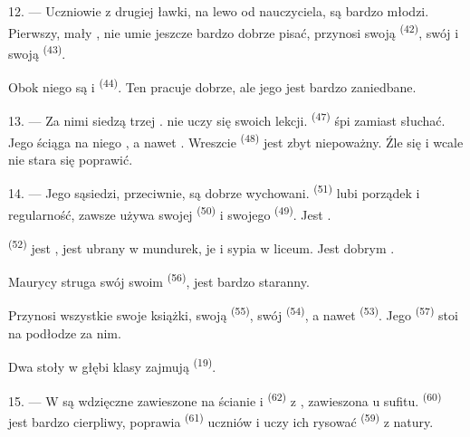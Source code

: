 12. --- Uczniowie z drugiej ławki, na lewo od nauczyciela, są bardzo młodzi. Pierwszy,
mały , nie umie jeszcze bardzo dobrze pisać, przynosi swoją
 \textsuperscript{(42)}, swój  i swoją 
\textsuperscript{(43)}.

Obok niego są  i  \textsuperscript{(44)}. Ten pracuje
dobrze, ale jego  jest bardzo zaniedbane.

13. --- Za nimi siedzą trzej .  nie uczy się swoich
lekcji.  \textsuperscript{(47)} śpi zamiast słuchać. Jego
 ściąga na niego , a nawet . Wreszcie
 \textsuperscript{(48)} jest zbyt niepoważny. Źle się 
i wcale nie stara się poprawić.

14. --- Jego sąsiedzi, przeciwnie, są dobrze wychowani. 
\textsuperscript{(51)} lubi porządek i regularność, zawsze używa swojej
 \textsuperscript{(50)} i swojego  \textsuperscript{(49)}.
Jest .

 \textsuperscript{(52)} jest , jest ubrany w
mundurek, je i sypia w liceum. Jest dobrym .

Maurycy struga swój  swoim  \textsuperscript{(56)},
jest bardzo staranny.

Przynosi wszystkie swoje książki, swoją  \textsuperscript{(55)}, swój
 \textsuperscript{(54)}, a nawet 
\textsuperscript{(53)}. Jego  \textsuperscript{(57)} stoi na podłodze
za nim.

Dwa stoły w głębi klasy zajmują  \textsuperscript{(19)}.

\VUsaut{4.6mm}
\VUsaut{3.4mm}

15. --- W  są wdzięczne  zawieszone na ścianie i
 \textsuperscript{(62)} z , zawieszona u sufitu.
 \textsuperscript{(60)} jest bardzo cierpliwy, poprawia
 \textsuperscript{(61)} uczniów i uczy ich rysować 
\textsuperscript{(59)} z natury.

